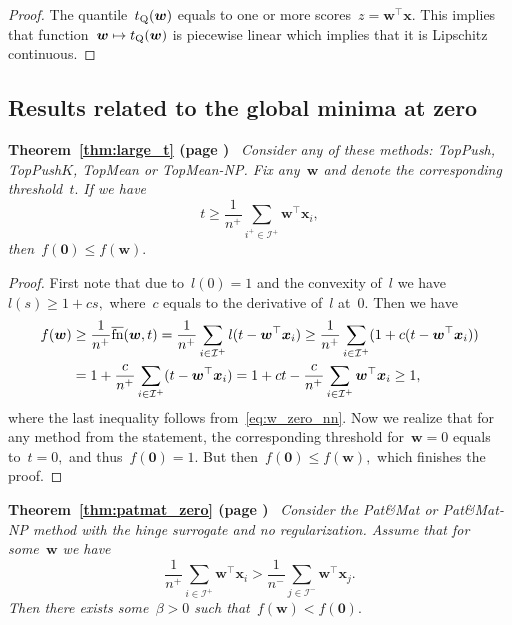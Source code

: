 \documentclass[11pt,a4paper]{article}
\theoremstyle{definition}
\newcommand{\I}{\mathcal{I}}
\newcommand{\fns}{\overline{\textnormal{fn}}}
\newcommand{\toppush}{\textit{TopPush}\xspace}
\newcommand{\toppushk}{\textit{TopPush$K$}\xspace}
\newcommand{\patmat}{\textit{Pat}\textup{\&}\textit{Mat}\xspace}
\newcommand{\topmean}{\textit{TopMean}\xspace}
\newcommand{\patmatnp}{\textit{Pat}\textup{\&}\textit{Mat-NP}\xspace}
\newcommand{\topmeannp}{\textit{TopMean-NP}\xspace}
\newcommand{\TheoremRef}[2]{\noindent \textbf{Theorem~\ref{#1} (page \pageref{#1})}\ \emph{#2} \\}
\begin{document}
\begin{proof}
  The quantile~$t_{\rm Q}(\bm{w})$ equals to one or more scores~$z=\bm{w}^\top \bm{x}.$ This implies that function~$\bm{w}\mapsto t_{\rm Q}(\bm{w})$ is piecewise linear which implies that it is Lipschitz continuous.
\end{proof}


\subsection{Results related to the global minima at zero}

\TheoremRef{thm:large_t}{
  Consider any of these methods: \toppush, \toppushk, \topmean or \topmeannp. Fix any~$\bm{w}$ and denote the corresponding threshold~$t.$ If we have
  \begin{equation}\label{eq:w_zero_nn}
    t \ge \frac{1}{n^+} \sum_{i^+ \in \I^+} \bm{w}^\top \bm{x}_i,
  \end{equation}
  then~$f(\bm{0}) \le f(\bm{w}).$
}

\begin{proof}
  First note that due to~$l(0) = 1$ and the convexity of~$l$ we have~$l(s) \ge 1 + cs,$ where~$c$ equals to the derivative of~$l$ at~$0.$ Then we have
  \begin{align}
    f(\bm{w}) & \ge \frac{1}{n^+} \fns(\bm{w}, t)
                =   \frac{1}{n^+} \sum_{i \in \I^+}l(t - \bm{w}^\top \bm{x}_i)
                \ge \frac{1}{n^+} \sum_{i \in \I^+}(1 + c(t - \bm{w}^\top \bm{x}_i)) \\
              & = 1 + \frac{c}{n^+}\sum_{i \in \I^+}(t - \bm{w}^\top \bm{x}_i)
                = 1 + ct - \frac{c}{n^+}\sum_{i \in \I^+}\bm{w}^\top \bm{x}_i
                \ge 1,
  \end{align}
  where the last inequality follows from~\eqref{eq:w_zero_nn}. Now we realize that for any method from the statement, the corresponding threshold for~$\bm{w}=0$ equals to~$t=0,$ and thus~$f(\bm{0})=1.$ But then~$f(\bm{0})\le f(\bm{w}),$ which finishes the proof.
\end{proof}


\TheoremRef{thm:patmat_zero}{
  Consider the \patmat or \patmatnp method with the hinge surrogate and no regularization. Assume that for some~$\bm{w}$ we have
  \begin{equation}\label{eq:patmat_zero_nn}
    \frac{1}{n^+} \sum_{i \in \I^+} \bm{w}^\top \bm{x}_i > \frac{1}{n^-}\sum_{j \in \I^-}\bm{w}^\top \bm{x}_j.
  \end{equation}
  Then there exists some~$\beta>0$ such that~$f(\bm{w})<f(\bm{0}).$
}
\end{document}
